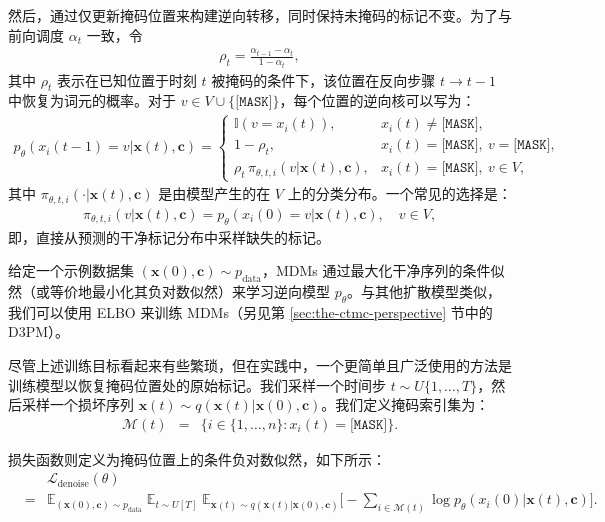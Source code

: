\documentclass[UTF8,a4paper,zihao=-4,oneside,openany]{ctexbook}
\begin{document}
\noindent 然后，通过仅更新掩码位置来构建逆向转移，同时保持未掩码的标记不变。为了与前向调度 $\alpha_t$ 一致，令
\begin{eqnarray}
\rho_t=\frac{\alpha_{t-1}-\alpha_t}{1-\alpha_t},
\label{eq:mdm-unmask-probability}
\end{eqnarray}
其中 $\rho_t$ 表示在已知位置于时刻 $t$ 被掩码的条件下，该位置在反向步骤 $t\to t-1$ 中恢复为词元的概率。对于 $v\in V\cup\{\texttt{[MASK]}\}$，每个位置的逆向核可以写为：
\begin{eqnarray}
p_\theta(x_i(t-1)=v| \mathbf{x}(t), \mathbf{c})
=
\begin{cases}
\mathbb{I}\!\left(v=x_i(t)\right), & x_i(t) \neq \texttt{[MASK]},\\
1-\rho_t, & x_i(t)=\texttt{[MASK]},\ v=\texttt{[MASK]},\\
\rho_t\,\pi_{\theta,t,i}\!\left(v | \mathbf{x}(t), \mathbf{c}\right),
& x_i(t)=\texttt{[MASK]},\ v\in V,
\end{cases}
\label{eq:mdm-reverse-keep-or-sample}
\end{eqnarray}
其中 $\pi_{\theta,t,i}(\cdot | \mathbf{x}(t),\mathbf{c})$ 是由模型产生的在 $V$ 上的分类分布。一个常见的选择是：
\begin{eqnarray}
\pi_{\theta,t,i}\!\left(v | \mathbf{x}(t),\mathbf{c}\right)=p_\theta\!\left(x_i(0)=v | \mathbf{x}(t),\mathbf{c}\right), \quad v\in V,
\label{eq:mdm-pi-as-denoise}
\end{eqnarray}
即，直接从预测的干净标记分布中采样缺失的标记。

给定一个示例数据集 $(\mathbf{x}(0),\mathbf{c})\sim p_{\text{data}}$，MDMs 通过最大化干净序列的条件似然（或等价地最小化其负对数似然）来学习逆向模型 $p_\theta$。与其他扩散模型类似，我们可以使用 ELBO 来训练 MDMs（另见第 \ref{sec:the-ctmc-perspective} 节中的 D3PM）。

尽管上述训练目标看起来有些繁琐，但在实践中，一个更简单且广泛使用的方法是训练模型以恢复掩码位置处的原始标记。我们采样一个时间步 $t\sim U\{1,\dots,T\}$，然后采样一个损坏序列 $\mathbf{x}(t)\sim q(\mathbf{x}(t)| \mathbf{x}(0),\mathbf{c})$。我们定义掩码索引集为：
\begin{eqnarray}
\mathcal{M}(t) & = & \{i\in\{1,\dots,n\} : x_i(t)=\texttt{[MASK]}\}.
\end{eqnarray}

\noindent 损失函数则定义为掩码位置上的条件负对数似然，如下所示：
\begin{eqnarray}
& & \mathcal{L}_{\text{denoise}}(\theta) \nonumber \\
&=&
\mathbb{E}_{(\mathbf{x}(0),\mathbf{c})\sim p_{\text{data}}}
\;
\mathbb{E}_{t\sim U[T]}
\;
\mathbb{E}_{\mathbf{x}(t)\sim q(\mathbf{x}(t)| \mathbf{x}(0),\mathbf{c})}
\Bigg[
-\sum_{i\in \mathcal{M}(t)} \log p_\theta\!\left(x_i(0)| \mathbf{x}(t),\mathbf{c}\right)
\Bigg].
\label{eq:mdm-denoise-ce}
\end{eqnarray}
\end{document}
